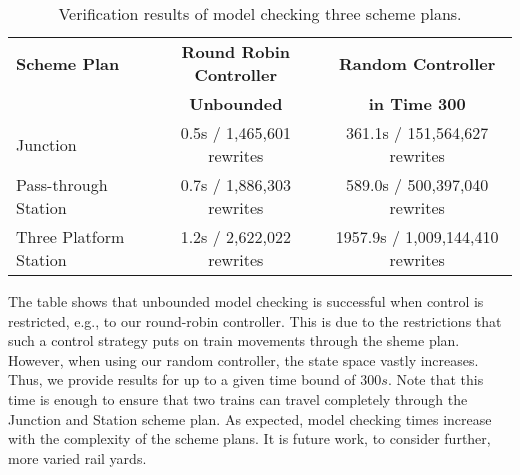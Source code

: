 \vspace{-0.3cm}
\begin{table}
\centering
\caption{Verification results of model checking three scheme plans.}
{\small
  \begin{tabular}{|l|c|c|}
    \hline 
    \textbf{Scheme Plan} & \textbf{Round Robin Controller} &
    \textbf{Random Controller} \\
    & \textbf{Unbounded} & \textbf{in Time 300} \\
    \hline \hline
    Junction  & 0.5s / 1,465,601 rewrites & \hphantom{1}361.1s /   \hphantom{1}\hphantom{1}151,564,627 rewrites \\
    Pass-through Station & 0.7s  / 1,886,303  rewrites & \hphantom{1}589.0s /  \hphantom{1}\hphantom{1}500,397,040 rewrites \\
    Three Platform Station & 1.2s / 2,622,022  rewrites & 1957.9s / 1,009,144,410  rewrites \\
    \hline
 \end{tabular}
}
\end{table}
\vspace{-0.3cm}

%

The table shows that unbounded model checking is successful when
control is restricted, e.g., to our round-robin controller. This is due to the restrictions that such a control strategy puts on train movements through the sheme plan. However,
when using our random controller, the state space vastly
increases. Thus, we provide results for up to a given time bound of
$300s$. Note that this time is enough to ensure that two trains can
travel completely through the Junction and Station scheme
plan. As expected, model checking times increase with the complexity of the scheme plans. 
It is future work, to consider further, more varied rail
yards.
